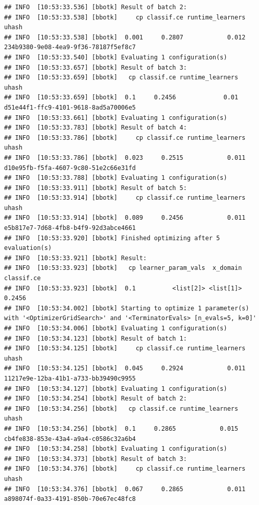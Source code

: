 \documentclass[
]{scrbook}
\begin{document}
\begin{verbatim}
## INFO  [10:53:33.536] [bbotk] Result of batch 2: 
## INFO  [10:53:33.538] [bbotk]     cp classif.ce runtime_learners                                uhash 
## INFO  [10:53:33.538] [bbotk]  0.001     0.2807            0.012 234b9380-9e08-4ea9-9f36-78187f5ef8c7 
## INFO  [10:53:33.540] [bbotk] Evaluating 1 configuration(s) 
## INFO  [10:53:33.657] [bbotk] Result of batch 3: 
## INFO  [10:53:33.659] [bbotk]   cp classif.ce runtime_learners                                uhash 
## INFO  [10:53:33.659] [bbotk]  0.1     0.2456             0.01 d51e44f1-ffc9-4101-9618-8ad5a70006e5 
## INFO  [10:53:33.661] [bbotk] Evaluating 1 configuration(s) 
## INFO  [10:53:33.783] [bbotk] Result of batch 4: 
## INFO  [10:53:33.786] [bbotk]     cp classif.ce runtime_learners                                uhash 
## INFO  [10:53:33.786] [bbotk]  0.023     0.2515            0.011 d10e95fb-f5fa-4607-9c80-51e2c66e31fd 
## INFO  [10:53:33.788] [bbotk] Evaluating 1 configuration(s) 
## INFO  [10:53:33.911] [bbotk] Result of batch 5: 
## INFO  [10:53:33.914] [bbotk]     cp classif.ce runtime_learners                                uhash 
## INFO  [10:53:33.914] [bbotk]  0.089     0.2456            0.011 e5b817e7-7d68-4fb8-b4f9-92d3abce4661 
## INFO  [10:53:33.920] [bbotk] Finished optimizing after 5 evaluation(s) 
## INFO  [10:53:33.921] [bbotk] Result: 
## INFO  [10:53:33.923] [bbotk]   cp learner_param_vals  x_domain classif.ce 
## INFO  [10:53:33.923] [bbotk]  0.1          <list[2]> <list[1]>     0.2456 
## INFO  [10:53:34.002] [bbotk] Starting to optimize 1 parameter(s) with '<OptimizerGridSearch>' and '<TerminatorEvals> [n_evals=5, k=0]' 
## INFO  [10:53:34.006] [bbotk] Evaluating 1 configuration(s) 
## INFO  [10:53:34.123] [bbotk] Result of batch 1: 
## INFO  [10:53:34.125] [bbotk]     cp classif.ce runtime_learners                                uhash 
## INFO  [10:53:34.125] [bbotk]  0.045     0.2924            0.011 11217e9e-12ba-41b1-a733-bb39490c9955 
## INFO  [10:53:34.127] [bbotk] Evaluating 1 configuration(s) 
## INFO  [10:53:34.254] [bbotk] Result of batch 2: 
## INFO  [10:53:34.256] [bbotk]   cp classif.ce runtime_learners                                uhash 
## INFO  [10:53:34.256] [bbotk]  0.1     0.2865            0.015 cb4fe838-853e-43a4-a9a4-c0586c32a6b4 
## INFO  [10:53:34.258] [bbotk] Evaluating 1 configuration(s) 
## INFO  [10:53:34.373] [bbotk] Result of batch 3: 
## INFO  [10:53:34.376] [bbotk]     cp classif.ce runtime_learners                                uhash 
## INFO  [10:53:34.376] [bbotk]  0.067     0.2865            0.011 a898074f-0a33-4191-850b-70e67ec48fc8 

\end{verbatim}
\end{document}
